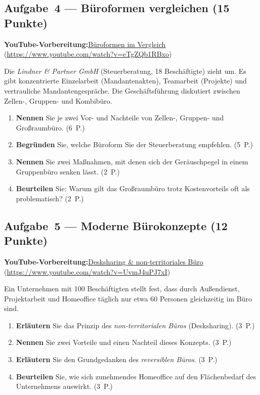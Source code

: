 \documentclass[11pt, a4paper]{article}
\begin{document}
\subsection*{Aufgabe~4 --- Büroformen vergleichen (15 Punkte)}

\noindent\textbf{\color{bfwAccent}YouTube-Vorbereitung:}\enspace \href{https://www.youtube.com/watch?v=eTgZQb1RBxo}{Büroformen im Vergleich} (\url{https://www.youtube.com/watch?v=eTgZQb1RBxo})

\medskip
Die \emph{Lindner \& Partner GmbH} (Steuerberatung, 18 Beschäftigte) zieht um. Es gibt
konzentrierte Einzelarbeit (Mandantenakten), Teamarbeit (Projekte) und vertrauliche
Mandantengespräche. Die Geschäftsführung diskutiert zwischen Zellen-, Gruppen- und
Kombibüro.

\begin{enumerate}[label=(\alph*)]
  \item \textbf{Nennen} Sie je zwei Vor- und Nachteile von Zellen-, Gruppen- und Großraumbüro. \hfill (6~P.)
  \item \textbf{Begründen} Sie, welche Büroform Sie der Steuerberatung empfehlen. \hfill (5~P.)
  \item \textbf{Nennen} Sie zwei Maßnahmen, mit denen sich der Geräuschpegel in einem Gruppenbüro senken lässt. \hfill (2~P.)
  \item \textbf{Beurteilen} Sie: Warum gilt das Großraumbüro trotz Kostenvorteils oft als problematisch? \hfill (2~P.)
\end{enumerate}

\subsection*{Aufgabe~5 --- Moderne Bürokonzepte (12 Punkte)}

\noindent\textbf{\color{bfwAccent}YouTube-Vorbereitung:}\enspace \href{https://www.youtube.com/watch?v=UvmJ4uPJ7xI}{Desksharing \& non-territoriales Büro} (\url{https://www.youtube.com/watch?v=UvmJ4uPJ7xI})

\medskip
Ein Unternehmen mit 100 Beschäftigten stellt fest, dass durch Außendienst, Projektarbeit
und Homeoffice täglich nur etwa 60 Personen gleichzeitig im Büro sind.

\begin{enumerate}[label=(\alph*)]
  \item \textbf{Erläutern} Sie das Prinzip des \emph{non-territorialen Büros} (Desksharing). \hfill (3~P.)
  \item \textbf{Nennen} Sie zwei Vorteile und einen Nachteil dieses Konzepts. \hfill (3~P.)
  \item \textbf{Erläutern} Sie den Grundgedanken des \emph{reversiblen Büros}. \hfill (3~P.)
  \item \textbf{Beurteilen} Sie, wie sich zunehmendes Homeoffice auf den Flächenbedarf des Unternehmens auswirkt. \hfill (3~P.)
\end{enumerate}
\end{document}
